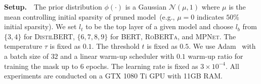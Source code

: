 \noindent
\textbf{Setup.}~~The prior distribution $\phi(\cdot)$ is a Gaussian $\mathcal{N}(\mu, 1)$ where $\mu$ is the mean controlling initial sparsity of pruned model~(e.g., $\mu=0$ indicates $50\%$ initial sparsity).
We set $l_t$ to be the top layer of a given model 
and choose $l_b$ from $\{3,4\}$ for \textsc{DistilBERT}, $\{6,7,8,9\}$ for \textsc{BERT}, \textsc{RoBERTa}, 
and \textsc{MPNet}. The temperature $\tau$ is fixed as $0.1$. The threshold $t$ is fixed as $0.5$. 
We use Adam~\citep{kingma2014method} with a batch size of $32$ and a linear warm-up scheduler 
with $0.1$ warm-up ratio for training the mask up to $6$ epochs. 
The learning rate is fixed as $3\times 10^{-4}$. All experiments are conducted on a GTX 1080 Ti GPU with 11GB RAM.


